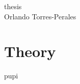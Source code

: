 \documentclass[12pt,twoside,a4paper,openright]{book}
\newcommand{\placetextbox}[3]{%
  \setbox0=\hbox{#3}%
  \AddToShipoutPictureFG*{%
    \put(\LenToUnit{#1\paperwidth},\LenToUnit{#2\paperheight}){\vtop{{\null}\makebox[0pt][c]{#3}}}%
  }%
}%
\begin{document}
\newpage\null\thispagestyle{empty}
\vspace{7cm}
\hspace{3cm}
{\huge{thesis}}\\
\normalsize
\vspace{0.5cm}
Orlando Torres-Perales

\newpage\null\thispagestyle{empty}
\clearpage

\tableofcontents
\newpage
\chapter{Theory}

\newpage

\newpage

pupi
\printbibliography
\end{document}
